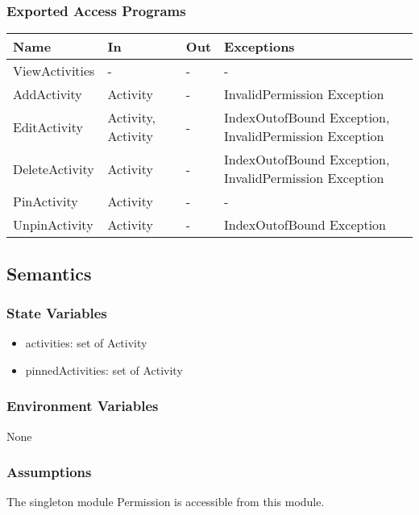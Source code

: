 \documentclass[12pt, titlepage]{article}
\begin{document}
\subsubsection{Exported Access Programs}
\begin{center}
\begin{tabular}{p{4cm} p{2cm} p{4cm} p{4cm}}
\hline
\textbf{Name} & \textbf{In} & \textbf{Out} & \textbf{Exceptions} \\
\hline
ViewActivities & - & - & - \\
AddActivity & Activity & - & InvalidPermission Exception \\
EditActivity & Activity, Activity & - & IndexOutofBound Exception, InvalidPermission Exception \\
DeleteActivity & Activity & - & IndexOutofBound Exception, InvalidPermission Exception \\
PinActivity & Activity & - & - \\
UnpinActivity & Activity & - & IndexOutofBound Exception \\
\hline
\end{tabular}
\end{center}

\subsection{Semantics}

\subsubsection{State Variables}

\begin{itemize}
  \item activities: set of Activity
  \item pinnedActivities: set of Activity
\end{itemize}

\subsubsection{Environment Variables}

None

\subsubsection{Assumptions}

The singleton module Permission is accessible from this module.
\end{document}
